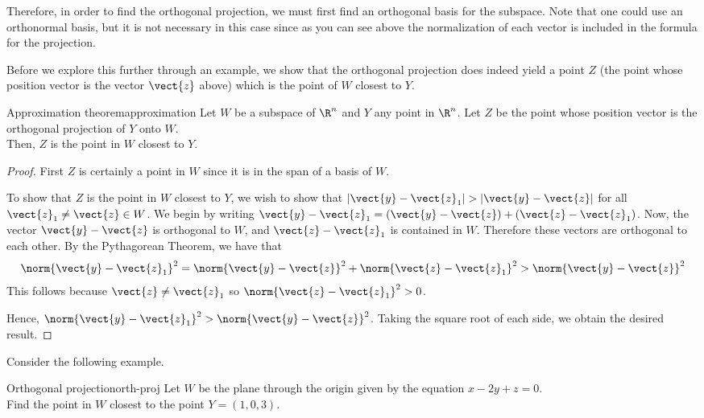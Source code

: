 Therefore, in order to find the orthogonal projection, we must first
find an orthogonal basis for the subspace. Note that one could use an
orthonormal basis, but it is not necessary in this case since as you
can see above the normalization of each vector is included in the
formula for the projection.

Before we explore this further through an example, we show that the
orthogonal projection does indeed yield a point $Z$ (the point whose position
vector is the vector $\vect{z}$ above) which is the point of $W$
closest to $Y$.

\begin{theorem}{Approximation theorem}{approximation}
Let $W$ be a subspace of $\R^n$ and $Y$ any point in
$\R^n$. Let $Z$ be the point whose position vector is the
orthogonal projection of $Y$ onto $W$. \\
Then, $Z$ is the point in $W$ closest to $Y$.
\end{theorem}

\begin{proof}
First $Z$ is certainly a point in $W$  since it is in the span of a basis of $W$. 

To show that $Z$ is the point in $W$ closest to $Y$, we wish to show
that $|\vect{y}-\vect{z}_1| > |\vect{y}-\vect{z}|$ for all $\vect{z}_1
\neq \vect{z} \in W$.  We begin by writing $\vect{y}-\vect{z}_1 =
(\vect{y} - \vect{z}) + (\vect{z} -
\vect{z}_1)$.  Now, the vector $\vect{y} - \vect{z}$ is orthogonal to
$W$, and $\vect{z} - \vect{z}_1$ is contained in $W$. Therefore these
vectors are orthogonal to each other. By the Pythagorean Theorem, we
have that
\[
\norm{\vect{y} - \vect{z}_1}^2 = \norm{\vect{y} - \vect{z}} ^2 + \norm{\vect{z} -\vect{z}_1} ^2 > \norm{\vect{y} - \vect{z}}^2
\]
This follows because $\vect{z} \neq \vect{z}_1$ so
$\norm{\vect{z} -\vect{z}_1}^2 > 0$.

Hence, $\norm{\vect{y} - \vect{z}_1}^2 > \norm{
\vect{y} - \vect{z}}^2$. Taking the square root of each
side, we obtain the desired result.
\end{proof}

Consider the following example.

\begin{example}{Orthogonal projection}{orth-proj}
Let $W$ be the plane through the origin given by the equation $x - 2y
+ z = 0$. \\
Find the point in $W$ closest to the point $Y = (1,0,3)$.
\end{example}

